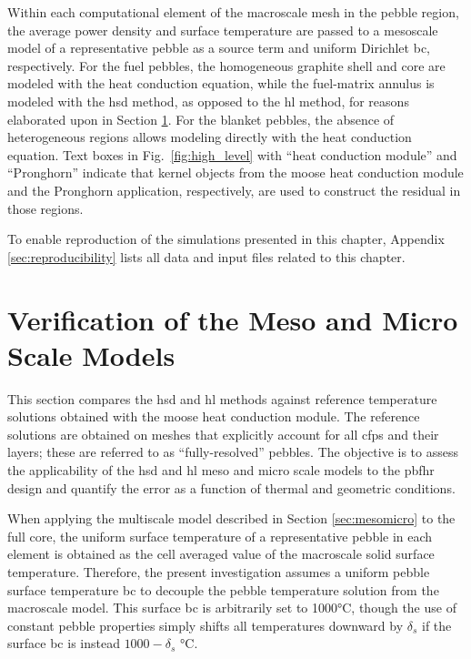 Within each computational element of the macroscale mesh in the pebble region, the average power density and surface temperature are passed to a mesoscale model of a representative pebble as a source term and uniform Dirichlet \gls{bc}, respectively. For the fuel pebbles, the homogeneous graphite shell and core are modeled with the heat conduction equation, while the fuel-matrix annulus is modeled with the \gls{hsd} method, as opposed to the \gls{hl} method, for reasons elaborated upon in Section \ref{sec:meso_fhr}. For the blanket pebbles, the absence of heterogeneous regions allows modeling directly with the heat conduction equation. Text boxes in Fig.\ \ref{fig:high_level} with ``heat conduction module'' and ``Pronghorn'' indicate that kernel objects from the \gls{moose} heat conduction module and the Pronghorn application, respectively, are used to construct the residual in those regions.

To enable reproduction of the simulations presented in this chapter, Appendix \ref{sec:reproducibility} lists all data and input files related to this chapter.

\section{Verification of the Meso and Micro Scale Models}
\label{sec:meso_fhr}

This section compares the \gls{hsd} and \gls{hl} methods against reference temperature solutions obtained with the \gls{moose} heat conduction module. The reference solutions are obtained on meshes that explicitly account for all \glspl{cfp} and their layers; these are referred to as ``fully-resolved'' pebbles. The objective is to assess the applicability of the \gls{hsd} and \gls{hl} meso and micro scale models to the \gls{pbfhr} design and quantify the error as a function of thermal and geometric conditions.

When applying the multiscale model described in Section \ref{sec:mesomicro} to the full core, the uniform surface temperature of a representative pebble in each element is obtained as the cell averaged value of the macroscale solid surface temperature. Therefore, the present investigation assumes a uniform pebble surface temperature \gls{bc} to decouple the pebble temperature solution from the macroscale model. This surface \gls{bc} is arbitrarily set to 1000\si{\celsius}, though the use of constant pebble properties simply shifts all temperatures downward by \(\delta_s\) if the surface \gls{bc} is instead \(1000-\delta_s\) \si{\celsius}.

